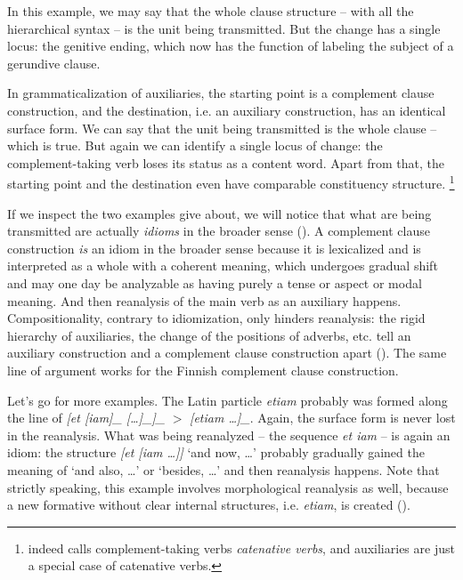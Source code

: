 \documentclass[a4paper, oneside, scheme=plain, 12pt]{article}
\newcommand*{\citepage}[1]{p.~{#1}}
\newcommand*{\term}[1]{\emph{#1}}
\newcommand{\form}[1]{\emph{#1}}
\newcommand*{\textgt}{$>$ }
\newcommand{\translate}[1]{`#1'}
\begin{document}
In this example, we may say that the whole clause structure -- with all the hierarchical syntax -- is the unit being transmitted.
But the change has a single locus: the genitive ending,
which now has the function of labeling the subject of a gerundive clause.

In grammaticalization of auxiliaries,
the starting point is a complement clause construction,
and the destination, i.e. an auxiliary construction, has an identical surface form.
We can say that the unit being transmitted is the whole clause -- which is true.
But again we can identify a single locus of change:
the complement-taking verb loses its status as a content word.
Apart from that, the starting point and the destination even have comparable constituency structure.%
\footnote{
    \citet[\citepage{65}]{cgel} indeed calls complement-taking verbs \term{catenative verbs},
    and auxiliaries are just a special case of catenative verbs.
}

If we inspect the two examples give about, we will notice that 
what are being transmitted are actually \emph{idioms} in the broader sense ().
A complement clause construction \emph{is} an idiom in the broader sense
because it is lexicalized and is interpreted as a whole with a coherent meaning,
which undergoes gradual shift and may one day be analyzable as having purely a tense or aspect or modal meaning.
And then reanalysis of the main verb as an auxiliary happens.
Compositionality, contrary to idiomization, only hinders reanalysis:
the rigid hierarchy of auxiliaries, the change of the positions of adverbs, etc.
tell an auxiliary construction and a complement clause construction apart
().
The same line of argument works for the Finnish complement clause construction.

Let's go for more examples.
The Latin particle \form{etiam} probably was formed along the line of 
\form{[et [iam]_{} [\dots]_{}]_{\text{coordinate clause}}} 
\textgt \form{[etiam \dots]_{}}.
Again, the surface form is never lost in the reanalysis.
What was being reanalyzed -- the sequence \form{et iam} -- is again an idiom:
the structure \form{[et [iam \dots]]} \translate{and now, \dots}
probably gradually gained the meaning of \translate{and also, \dots} or \translate{besides, \dots}
and then reanalysis happens.
Note that strictly speaking, this example involves morphological reanalysis as well,
because a new formative without clear internal structures, i.e. \form{etiam}, is created
().
\end{document}
